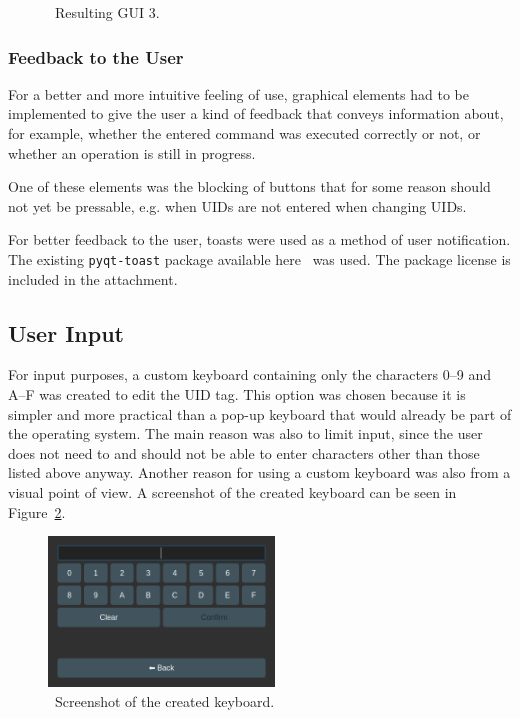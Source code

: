 \begin{figure}[h]
\begin{minipage}[b]{0.315\textwidth}
        \caption{~Resulting GUI 3.}
        \label{fig:ui3}
    \end{minipage}
\end{figure}


\subsubsection{Feedback to the User}
For a better and more intuitive feeling of use, graphical elements had to be implemented to give the user a kind of feedback that conveys information about, for example, whether the entered command was executed correctly or not, or whether an operation is still in progress.

One of these elements was the blocking of buttons that for some reason should not yet be pressable, e.g. when UIDs are not entered when changing UIDs.

For better feedback to the user, toasts were used as a method of user notification. The existing \texttt{pyqt-toast} package available here~\cite{toast} was used. The package license is included in the attachment.


\subsection{User Input}

For input purposes, a custom keyboard containing only the characters 0--9 and A--F was created to edit the UID tag. This option was chosen because it is simpler and more practical than a pop-up keyboard that would already be part of the operating system. The main reason was also to limit input, since the user does not need to and should not be able to enter characters other than those listed above anyway. Another reason for using a custom keyboard was also from a visual point of view. A screenshot of the created keyboard can be seen in Figure~\ref{fig:keyboard}.

\begin{figure}[ht]
  \centering
  \includegraphics[width=6cm]{text/keyboard.png}
  \caption{~Screenshot of the created keyboard.}
  \label{fig:keyboard}
\end{figure}


